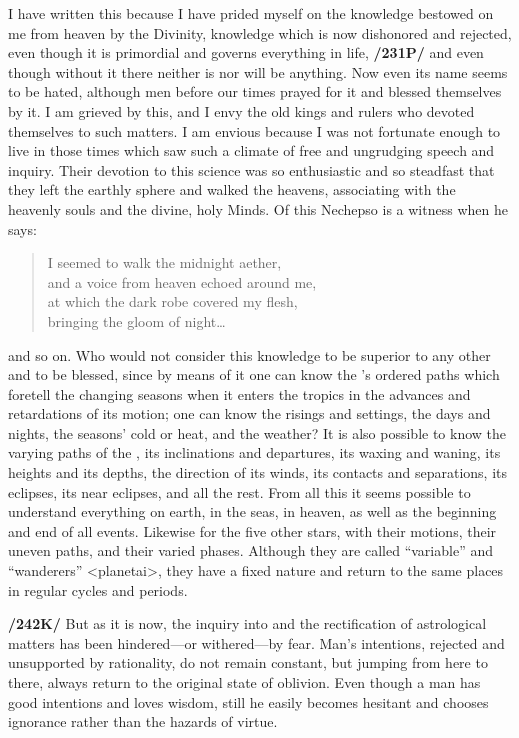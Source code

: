 I have written this because I have prided myself on the knowledge bestowed on me from heaven by the Divinity, knowledge which is now dishonored and rejected, even though it is primordial and governs everything in life, \textbf{/231P/} and even though without it there neither is nor will be anything. Now even its name seems to be hated, although men before our times prayed for it and blessed themselves by it. I am grieved by this, and I envy the old kings and rulers who devoted themselves to such matters. I am envious because I was not fortunate enough to live in those times which saw such a climate of free and ungrudging speech and inquiry. Their devotion to this science was so enthusiastic and so steadfast that they left the earthly sphere and walked the heavens, associating with the heavenly souls and the divine, holy Minds. Of this Nechepso is a witness when he says:
\begin{verse}
		I seemed to walk the midnight aether, \\
		and a voice from heaven echoed around me, \\
		at which the dark robe covered my flesh, \\
		bringing the gloom of night…\\
\end{verse}	 
and so on. Who would not consider this knowledge to be superior to any other and to be blessed, since by means of it one can know the \Sun’s ordered paths which foretell the changing seasons when it enters the tropics in the advances and retardations of its motion; one can know the risings and settings, the days and nights, the seasons’ cold or heat, and the weather? It is also possible to know the varying paths of the \Moon, its inclinations and departures, its waxing and waning, its heights and its depths, the direction of its winds, its contacts and separations, its eclipses, its near eclipses, and all the rest. From all this it seems possible to understand everything on earth, in the seas, in heaven, as well as the beginning and end of all events. Likewise for the five other stars, with their motions, their uneven paths, and their varied phases. Although they are called “variable” and “wanderers” <planetai>, they have a fixed nature and return to the same places in regular cycles and periods. 

\textbf{/242K/} But as it is now, the inquiry into and the rectification of astrological matters has been hindered—or withered—by fear. Man’s intentions, rejected and unsupported by rationality, do not remain
constant, but jumping from here to there, always return to the original state of oblivion. Even though a man has good intentions and loves wisdom, still he easily becomes hesitant and chooses ignorance rather
than the hazards of virtue.

